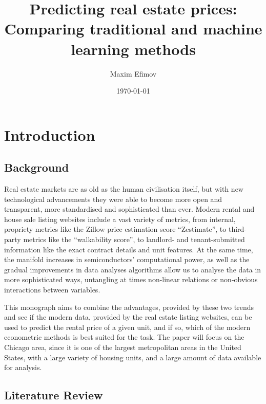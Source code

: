 \documentclass[12pt]{report}
\title{Predicting real estate prices: Comparing traditional and machine learning methods}
\author{Maxim Efimov}
\date{\today}
\begin{document}
\maketitle
\tableofcontents
\newpage
{} %
\fontsize{12}{18}\selectfont %
\renewcommand{\footnotesize}{\fontsize{10}{12}\selectfont} %


\newpage

\section{Introduction}
\subsection{Background}

Real estate markets are as old as the human civilisation itself, but with new technological advancements they were able to become more open and transparent, more standardised and sophisticated than ever. Modern rental and house sale listing websites include a vast variety of metrics, from internal, propriety metrics like the Zillow price estimation score “Zestimate”, to third-party metrics like the “walkability score”, to landlord- and tenant-submitted information like the exact contract details and unit features. At the same time, the manifold increases in semiconductors’ computational power, as well as the gradual improvements in data analyses algorithms allow us to analyse the data in more sophisticated ways, untangling at times non-linear relations or non-obvious interactions between variables.

This monograph aims to combine the advantages, provided by these two trends and see if the modern data, provided by the real estate listing websites, can be used to predict the rental price of a given unit, and if so, which of the modern econometric methods is best suited for the task. The paper will focus on the Chicago area, since it is one of the largest metropolitan areas in the United States, with a large variety of housing units, and a large amount of data available for analysis.

\subsection{Literature Review}
\end{document}
